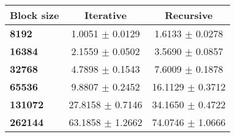 \begin{tabular}{lcc}\toprule
\textbf{Block size}  & \textbf{Iterative} & \textbf{Recursive}\\\midrule
\textbf{8192}  & 1.0051 $\pm$ 0.0129 & 1.6133 $\pm$ 0.0278\\
\textbf{16384}  & 2.1559 $\pm$ 0.0502 & 3.5690 $\pm$ 0.0857\\
\textbf{32768}  & 4.7898 $\pm$ 0.1543 & 7.6009 $\pm$ 0.1878\\
\textbf{65536}  & 9.8807 $\pm$ 0.2452 & 16.1129 $\pm$ 0.3712\\
\textbf{131072}  & 27.8158 $\pm$ 0.7146 & 34.1650 $\pm$ 0.4722\\
\textbf{262144} & 63.1858 $\pm$ 1.2662 & 74.0746 $\pm$ 1.0666\\
\bottomrule
\end{tabular}
